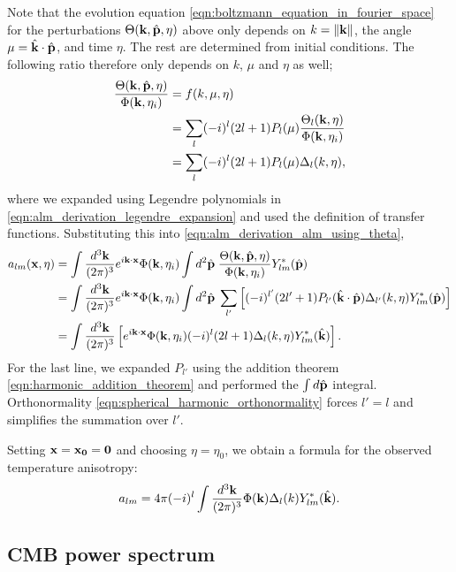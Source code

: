 Note that the evolution equation \eqref{eqn:boltzmann_equation_in_fourier_space} for the perturbations $\Theta(\mathbf{k},\hat{\mathbf{p}},\eta)$ above only depends on $k=\|\mathbf{k}\|$, the angle $\mu = \hat{\mathbf{k}} \cdot \hat{\mathbf{p}}$, and time $\eta$. The rest are determined from initial conditions. The following ratio therefore only depends on $k$, $\mu$ and $\eta$ as well;
\begin{align}
	\frac{\Theta(\mathbf{k},\hat{\mathbf{p}},\eta)}{\Phi(\mathbf{k},\eta_i)} &= f(k, \mu, \eta) \\
	&= \sum_l (-i)^l (2l+1) P_l(\mu) \frac{\Theta_l(\mathbf{k},\eta)}{\Phi(\mathbf{k},\eta_i)} \label{eqn:alm_derivation_legendre_expansion}\\ 
	&= \sum_l (-i)^l (2l+1) P_l(\mu) \Delta_l(k,\eta),
\end{align}
where we expanded using Legendre polynomials in \eqref{eqn:alm_derivation_legendre_expansion} and used the definition of transfer functions. Substituting this into \eqref{eqn:alm_derivation_alm_using_theta},
\begin{align}
	a_{lm}(\mathbf{x},\eta) &= \int \frac{d^3\mathbf{k}}{(2\pi)^3} e^{i\mathbf{k}\cdot\mathbf{x}} \Phi(\mathbf{k}, \eta_i) \int d^2\hat{\mathbf{p}} \; \frac{\Theta(\mathbf{k},\hat{\mathbf{p}},\eta)}{\Phi(\mathbf{k}, \eta_i)} Y^*_{lm}(\hat{\mathbf{p}}) \\
	&= \int \frac{d^3\mathbf{k}}{(2\pi)^3} e^{i\mathbf{k}\cdot\mathbf{x}} \Phi(\mathbf{k}, \eta_i) \int d^2\hat{\mathbf{p}} \; \sum_{l'} \left[ (-i)^{l'} (2l'+1) P_{l'}(\hat{\mathbf{k}}\cdot\hat{\mathbf{p}}) \Delta_{l'}(k,\eta) Y^*_{lm}(\hat{\mathbf{p}}) \right] \\
	&= \int \frac{d^3\mathbf{k}}{(2\pi)^3} \left[ e^{i\mathbf{k}\cdot\mathbf{x}} \Phi(\mathbf{k}, \eta_i) (-i)^{l} (2l+1) \Delta_{l}(k,\eta) Y^*_{lm}(\hat{\mathbf{k}}) \right].
\end{align}
For the last line, we expanded $P_{l'}$ using the addition theorem \eqref{eqn:harmonic_addition_theorem} and performed the $\int d\hat{\mathbf{p}}$ integral. Orthonormality \eqref{eqn:spherical_harmonic_orthonormality} forces $l'=l$ and simplifies the summation over $l'$.

Setting $\mathbf{x}=\mathbf{x_0} = \mathbf{0}$ and choosing $\eta=\eta_0$, we obtain a formula for the observed temperature anisotropy:
\begin{align}
	a_{lm} = 4\pi (-i)^l \int \frac{d^3\mathbf{k}}{(2\pi)^3} \Phi(\mathbf{k}) \Delta_{l}(k) Y^*_{lm}(\hat{\mathbf{k}}). \label{eqn:alm_from_phi}
\end{align}

\subsection{CMB power spectrum}

